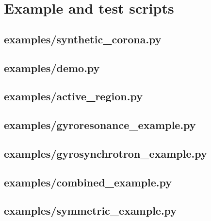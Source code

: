 \chapter{Example and test scripts}
\section{examples/synthetic\_corona.py}

\section{examples/demo.py}

\section{examples/active\_region.py}

\section{examples/gyroresonance\_example.py}

\section{examples/gyrosynchrotron\_example.py}

\section{examples/combined\_example.py}

\section{examples/symmetric\_example.py}

